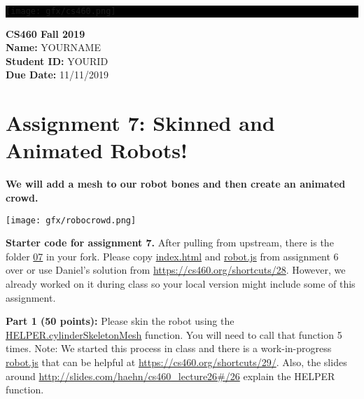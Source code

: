 \documentclass[10pt,oneside,onecolumn,letterpaper]{article}
\begin{document}
\noindent\colorbox{black}{
\begin{minipage}[c]{.99\linewidth}
  \vspace{.4cm}
  \Large{}
  \begin{flushright}
    \vspace{-1.2cm}
    \texttt{[image: gfx/cs460.png]}
  \end{flushright}
\end{minipage}
}


\vspace{.5cm} %

\noindent\textbf{CS460 Fall 2019} \\
\textbf{Name:} YOURNAME \\
\textbf{Student ID:} YOURID \\
\textbf{Due Date:} 11/11/2019

\section*{Assignment 7: Skinned and Animated Robots!}

\textbf{We will add a mesh to our robot bones and then create an animated crowd.}

\vspace{.5cm} %

\begin{center}
\texttt{[image: gfx/robocrowd.png]}
\end{center}

\vspace{.5cm}

\noindent\textbf{Starter code for assignment 7.} After pulling from upstream, there is the folder \url{07} in your fork. Please copy \url{index.html} and \url{robot.js} from assignment 6 over or use Daniel's solution from \url{https://cs460.org/shortcuts/28}.  However, we already worked on it during class so your local version might include some of this assignment.

\vspace{.5cm}


\noindent\textbf{Part 1 (50 points):} Please skin the robot using the \url{HELPER.cylinderSkeletonMesh} function. You will need to call that function 5 times. Note: We started this process in class and there is a work-in-progress \url{robot.js} that can be helpful at \url{https://cs460.org/shortcuts/29/}. Also, the slides around \url{http://slides.com/haehn/cs460_lecture26#/26} explain the HELPER function.
\end{document}
